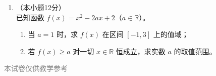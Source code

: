 \documentclass[12pt, a4paper]{ctexart}
\begin{document}
\begin{enumerate}[resume]
\vspace{7cm}

\item[22.]（本小题12分）\\
已知函数 $f(x)=x^2-2ax+2$（$a\in\mathbb{R}$）。
\begin{enumerate}[(1)]
  \item 当 $a=1$ 时，求 $f(x)$ 在区间 $[-1,3]$ 上的值域；
  \item 若 $f(x)\geq a$ 对一切 $x\in\mathbb{R}$ 恒成立，求实数 $a$ 的取值范围。
\end{enumerate}

\vspace{7cm}
\end{enumerate}

\vfill
\begin{center}
\small\textcolor{gray}{本试卷仅供教学参考}
\end{center}
\end{document}
